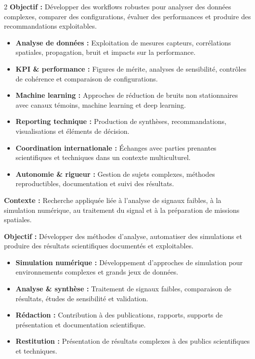 \documentclass[8pt,a4paper,ragged2e,withhyper]{altacv}
\begin{document}
\begin{paracol}{2}
\textbf{Objectif :} Développer des workflows robustes pour analyser des données complexes, comparer des configurations, évaluer des performances et produire des recommandations exploitables.

\begin{itemize}
  \item \textbf{Analyse de données :} Exploitation de mesures capteurs, corrélations spatiales, propagation, bruit et impacts sur la performance.
  \item \textbf{KPI \& performance :} Figures de mérite, analyses de sensibilité, contrôles de cohérence et comparaison de configurations.
  \item \textbf{Machine learning :} Approches de réduction de bruits non stationnaires avec canaux témoins, machine learning et deep learning.
  \item \textbf{Reporting technique :} Production de synthèses, recommandations, visualisations et éléments de décision.
  \item \textbf{Coordination internationale :} Échanges avec parties prenantes scientifiques et techniques dans un contexte multiculturel.
  \item \textbf{Autonomie \& rigueur :} Gestion de sujets complexes, méthodes reproductibles, documentation et suivi des résultats.
\end{itemize}

\divider


\textbf{Contexte :} Recherche appliquée liée à l’analyse de signaux faibles, à la simulation numérique, au traitement du signal et à la préparation de missions spatiales.

\textbf{Objectif :} Développer des méthodes d’analyse, automatiser des simulations et produire des résultats scientifiques documentés et exploitables.

\begin{itemize}
  \item \textbf{Simulation numérique :} Développement d’approches de simulation pour environnements complexes et grands jeux de données.
  \item \textbf{Analyse \& synthèse :} Traitement de signaux faibles, comparaison de résultats, études de sensibilité et validation.
  \item \textbf{Rédaction :} Contribution à des publications, rapports, supports de présentation et documentation scientifique.
  \item \textbf{Restitution :} Présentation de résultats complexes à des publics scientifiques et techniques.
\end{itemize}


\end{paracol}
\end{document}
